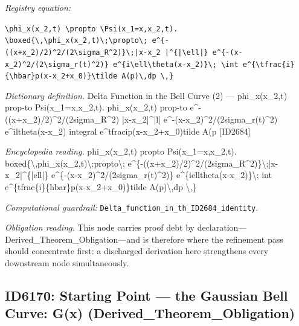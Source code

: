 \documentclass[11pt]{article}
\theoremstyle{remark}
\begin{document}
\noindent\textit{Registry equation:}\par
{\small\texttt{\textbackslash{}phi\_x(x\_2,t) \textbackslash{}propto \textbackslash{}Psi(x\_1=x,x\_2,t). \textbackslash{}boxed\{\textbackslash{},\textbackslash{}phi\_x(x\_2,t)\textbackslash{};\textbackslash{}propto\textbackslash{}; e\textasciicircum{}\{-((x+x\_2)/2)\textasciicircum{}2/(2\textbackslash{}sigma\_R\textasciicircum{}2)\}\textbackslash{};|x-x\_2 |\textasciicircum{}\{|\textbackslash{}ell|\} e\textasciicircum{}\{-(x-x\_2)\textasciicircum{}2/(2\textbackslash{}sigma\_r(t)\textasciicircum{}2)\} e\textasciicircum{}\{i\textbackslash{}ell\textbackslash{}theta(x-x\_2)\}\textbackslash{}; \textbackslash{}int e\textasciicircum{}\{\textbackslash{}tfrac\{i\}\{\textbackslash{}hbar\}p(x-x\_2+x\_0)\}\textbackslash{}tilde A(p)\textbackslash{},dp \textbackslash{},\}}}\par\medskip
\noindent\textit{Dictionary definition.} Delta Function in the Bell Curve (2) --- phi\_x(x\_2,t) prop-to Psi(x\_1=x,x\_2,t). phi\_x(x\_2,t) prop-to e\textasciicircum{}-((x+x\_2)/2)\textasciicircum{}2/(2sigma\_R\textasciicircum{}2) |x-x\_2|\textasciicircum{}|l| e\textasciicircum{}-(x-x\_2)\textasciicircum{}2/(2sigma\_r(t)\textasciicircum{}2) e\textasciicircum{}iltheta(x-x\_2) integral e\textasciicircum{}tfracip(x-x\_2+x\_0)tilde A(p [ID2684]\par\medskip
\noindent\textit{Encyclopedia reading.} phi\_x(x\_2,t) propto Psi(x\_1=x,x\_2,t). boxed\{\textbackslash{},phi\_x(x\_2,t)\textbackslash{};propto\textbackslash{}; e\textasciicircum{}\{-((x+x\_2)/2)\textasciicircum{}2/(2sigma\_R\textasciicircum{}2)\}\textbackslash{};|x-x\_2|\textasciicircum{}\{|ell|\} e\textasciicircum{}\{-(x-x\_2)\textasciicircum{}2/(2sigma\_r(t)\textasciicircum{}2)\} e\textasciicircum{}\{ielltheta(x-x\_2)\}\textbackslash{}; int e\textasciicircum{}\{tfrac\{i\}\{hbar\}p(x-x\_2+x\_0)\}tilde A(p)\textbackslash{},dp \textbackslash{},\}
\par\medskip\noindent\textit{Computational guardrail:} \texttt{Delta\_function\_in\_th\_ID2684\_identity}.
\par\medskip\noindent\textit{Obligation reading.} This node carries proof debt by declaration---Derived\_Theorem\_Obligation---and is therefore where the refinement pass should concentrate first: a discharged derivation here strengthens every downstream node simultaneously.

\subsection{ID6170: Starting Point --- the Gaussian Bell Curve: G(x) (Derived\_Theorem\_Obligation)}
\end{document}
